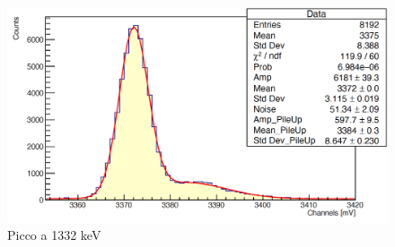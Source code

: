 \documentclass[a4paper,10pt]{article}
\begin{document}
\begin{figure}[H]
    \centering
    \includegraphics[scale=0.45]{appendice/spettri/CoPb2_108}
    \caption{Picco a 1332 keV}
\end{figure}

\end{document}
